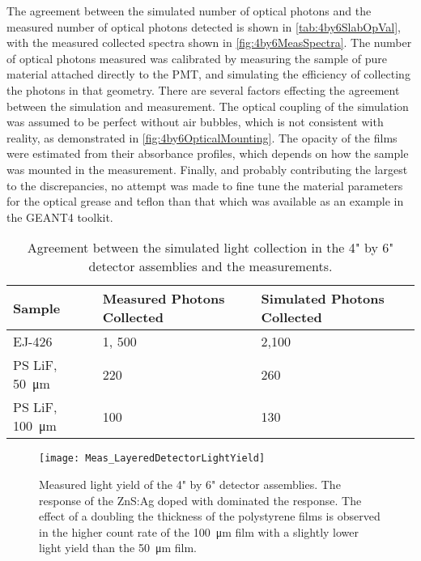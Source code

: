 The agreement between the simulated number of optical photons and the measured number of optical photons detected is shown in \autoref{tab:4by6SlabOpVal}, with the measured collected spectra shown in \autoref{fig:4by6MeasSpectra}.
The number of optical photons measured was calibrated by measuring the sample of pure material attached directly to the PMT, and simulating the efficiency of collecting the photons in that geometry.
There are several factors effecting the agreement between the simulation and measurement.
The optical coupling of the simulation was assumed to be perfect without air bubbles, which is not consistent with reality, as demonstrated in \autoref{fig:4by6OpticalMounting}.
The opacity of the films were estimated from their absorbance profiles, which depends on how the sample was mounted in the measurement.
Finally, and probably contributing the largest to the discrepancies, no attempt was made to fine tune the material parameters for the optical grease and teflon than that which was available as an example in the GEANT4 toolkit.
\begin{table}
	\caption[Agreement between Simulated and Measured Photon Collection in 4" by 6" Slabs]{Agreement between the simulated light collection in the 4" by 6" detector assemblies and the measurements.}
	\label{tab:4by6SlabOpVal}
	\begin{tabular}{m{4cm} m{3cm} m{3cm}}
	\toprule
	Sample & Measured Photons Collected & Simulated Photons Collected \\
	\midrule
	EJ-426 & 1, 500 & 2,100 \\
	PS LiF, \SI{50}{\um} & 220 & 260 \\
	PS LiF, \SI{100}{\um} & 100 & 130 \\
	\bottomrule
	\end{tabular}
\end{table}
\begin{figure}
	\centering
	\texttt{[image: Meas\_LayeredDetectorLightYield]}
	\caption[Measured Light Yield of the 4" by 6" Assemblies]{Measured light yield of the 4" by 6" detector assemblies. The response of the ZnS:Ag doped with  dominated the response.  The effect of a doubling the thickness of the polystyrene films is observed in the higher count rate of the \SI{100}{\um} film with a slightly lower light yield than the \SI{50}{\um} film.}
	\label{fig:4by6MeasSpectra}
\end{figure}
